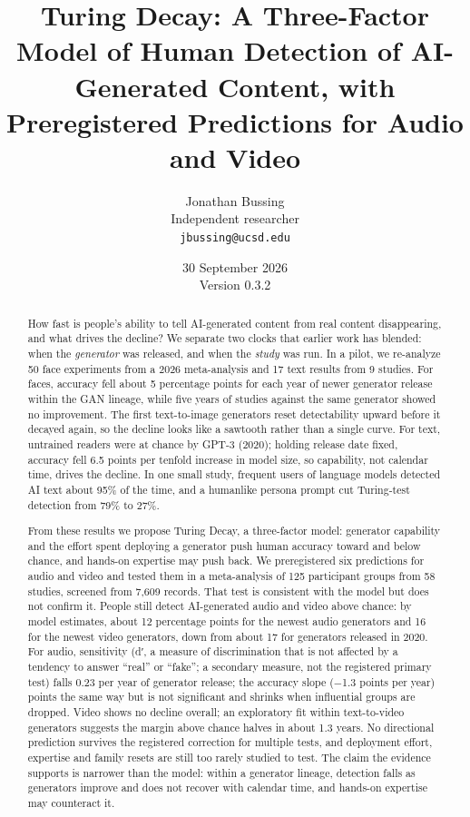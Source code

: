 \documentclass[11pt]{article}
\title{Turing Decay: A Three-Factor Model of Human Detection of AI-Generated Content, with Preregistered Predictions for Audio and Video}
\author{Jonathan Bussing\\ Independent researcher\\ \small\texttt{jbussing@ucsd.edu}}
\date{30 September 2026 \\ \small Version 0.3.2}
\begin{document}
\maketitle

\begin{abstract}
How fast is people's ability to tell AI-generated content from real
content disappearing, and what drives the decline? We separate two
clocks that earlier work has blended: when the \emph{generator} was
released, and when the \emph{study} was run. In a pilot, we re-analyze
50 face experiments from a 2026 meta-analysis and 17 text results from 9
studies. For faces, accuracy fell about 5 percentage points for each
year of newer generator release within the GAN lineage, while five years
of studies against the same generator showed no improvement. The first
text-to-image generators reset detectability upward before it decayed
again, so the decline looks like a sawtooth rather than a single curve.
For text, untrained readers were at chance by GPT-3 (2020); holding
release date fixed, accuracy fell 6.5 points per tenfold increase in
model size, so capability, not calendar time, drives the decline. In one
small study, frequent users of language models detected AI text about
95\% of the time, and a humanlike persona prompt cut Turing-test
detection from 79\% to 27\%.

From these results we propose Turing Decay, a three-factor model:
generator capability and the effort spent deploying a generator push
human accuracy toward and below chance, and hands-on expertise may push
back. We preregistered six predictions for audio and video and tested
them in a meta-analysis of 125 participant groups from 58 studies,
screened from 7,609 records. That test is consistent with the model but
does not confirm it. People still detect AI-generated audio and video
above chance: by model estimates, about 12 percentage points for the
newest audio generators and 16 for the newest video generators, down
from about 17 for generators released in 2020. For audio, sensitivity
(d′, a measure of discrimination that is not affected by a tendency to
answer ``real'' or ``fake''; a secondary measure, not the registered
primary test) falls 0.23 per year of generator release; the accuracy
slope (−1.3 points per year) points the same way but is not significant
and shrinks when influential groups are dropped. Video shows no decline
overall; an exploratory fit within text-to-video generators suggests the
margin above chance halves in about 1.3 years. No directional prediction
survives the registered correction for multiple tests, and deployment
effort, expertise and family resets are still too rarely studied to
test. The claim the evidence supports is narrower than the model: within
a generator lineage, detection falls as generators improve and does not
recover with calendar time, and hands-on expertise may counteract it.
\end{abstract}
\end{document}
